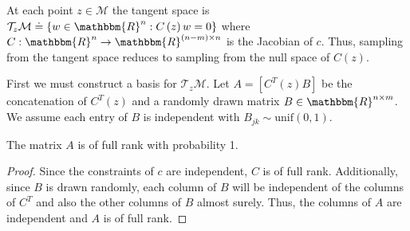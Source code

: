 At each point $z \in \mathcal{M}$ the tangent space is $\mathcal{T}_z\mathcal{M} \doteq \left\{w \in \mathbbm{R}^n : C\left(z\right)w = 0\right\}$ where $C: \mathbbm{R}^n \to \mathbbm{R}^{(n-m)\times n}$ is the Jacobian of $c$. Thus, sampling from the tangent space reduces to sampling from the null space of $C(z)$. 

First we must construct a basis for $\mathcal{T}_z\mathcal{M}$. Let $A = [C^T(z) B]$ be the concatenation of $C^T(z)$ and a randomly drawn matrix $B \in \mathbbm{R}^{n\times m}$. We assume each entry of $B$ is independent with $B_{jk} \sim  \text{unif}(0,1)$. 
\begin{mylem}
The matrix $A$ is of full rank with probability 1. 
\end{mylem}
\begin{proof}
Since the constraints of $c$ are independent, $C$ is of full rank. Additionally, since $B$ is drawn randomly, each column of $B$ will be independent of the columns of $C^T$  and also the other columns of $B$ almost surely. Thus, the columns of $A$ are independent and $A$ is of full rank. 
\end{proof}

